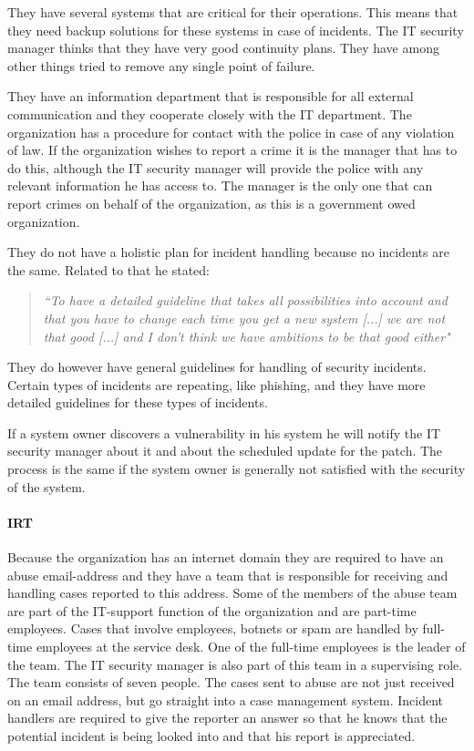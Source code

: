 They have several systems that are critical for their operations. This means that they need backup solutions for these systems in case of incidents. The IT security manager thinks that they have very good continuity plans. They have among other things tried to remove any single point of failure.

They have an information department that is responsible for all external communication and they cooperate closely with the IT department. The organization has a procedure for contact with the police in case of any violation of law. If the organization wishes to report a crime it is the manager that has to do this, although the IT security manager will provide the police with any relevant information he has access to. The manager is the only one that can report crimes on behalf of the organization, as this is a government owed organization.

They do not have a holistic plan for incident handling because no incidents are the same. Related to that he stated:

\begin{quote}
\textit{``To have a detailed guideline that takes all possibilities into account and that you have to change each time you get a new system %
[...] we are not that good [...] and I don't think we have ambitions to be that good either"}
\end{quote}

They do however have general guidelines for handling of security incidents. Certain types of incidents are repeating, like phishing, and they have more detailed guidelines for these types of incidents.

If a system owner discovers a vulnerability in his system he will notify the IT security manager about it and about the scheduled update for the patch. The process is the same if the system owner is generally not satisfied with the security of the system.

\paragraph{\acl{IRT}}
Because the organization has an internet domain they are required to have an abuse email-address and they have a team that is responsible for receiving and handling cases reported to this address. Some of the members of the abuse team are part of the IT-support function of the organization and are part-time employees. Cases that involve employees, botnets or spam are handled by full-time employees at the service desk. One of the full-time employees is the leader of the team. The IT security manager is also part of this team in a supervising role. The team consists of seven people. The cases sent to abuse are not just received on an email address, but go straight into a case management system. Incident handlers are required to give the reporter an answer so that he knows that the potential incident is being looked into and that his report is appreciated.


